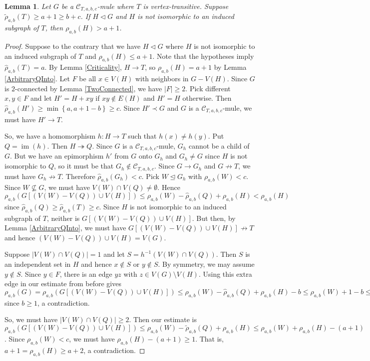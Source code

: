 \documentclass[12pt]{amsart}
\theoremstyle{plain}
\newtheorem{lem}[thm]{Lemma}
\theoremstyle{definition}
\theoremstyle{remark}
\newcommand{\fancy}[1]{\mathcal{#1}}
\newcommand{\C}{\fancy{C}}
\newcommand{\surj}{\twoheadrightarrow}
\newcommand{\set}[1]{\left\{ #1 \right\}}
\newcommand{\card}[1]{\left|#1\right|}
\newcommand{\func}[3]{#1\colon #2 \rightarrow #3}
\newcommand{\parens}[1]{\left( #1 \right)}
\newcommand{\brackets}[1]{\left[ #1 \right]}
\newcommand{\im}{\operatorname{im}}
\begin{document}
\begin{lem}\label{PlusOne}
Let $G$ be a $\C_{T,a,b,c}$-mule where $T$ is vertex-transitive. Suppose $\tilde{\rho}_{a,b}(T) \ge a + 1 \ge b + c$. If $H \lhd G$ and $H$ is not isomorphic to an induced subgraph of $T$, then $\rho_{a,b}(H) > a + 1$.
\end{lem}
\begin{proof}
Suppose to the contrary that we have $H \lhd G$ where $H$ is not isomorphic to an induced subgraph of $T$ and $\rho_{a,b}(H) \le a + 1$.  Note that the hypotheses imply $\hat{\rho}_{a,b}(T) = a$.  By Lemma \ref{Criticality}, $H \rightarrow T$, so $\rho_{a,b}(H) = a + 1$ by Lemma \ref{ArbitraryQInto}.  Let $F$ be all $x \in V(H)$ with neighbors in $G - V(H)$.  Since $G$ is $2$-connected by Lemma \ref{TwoConnected}, we have $|F| \ge 2$.  Pick different $x,y \in F$ and let $H' = H + xy$ if $xy \not \in E(H)$ and $H' = H$ otherwise.  Then $\hat{\rho}_{a,b}(H') \ge \min\set{a, a + 1 - b} \ge c$.  Since $H' \prec G$ and $G$ is a $\C_{T,a,b,c}$-mule, we must have $H' \rightarrow T$.

So, we have a homomorphism $\func{h}{H}{T}$ such that $h(x) \ne h(y)$.  Put $Q = \im(h)$. Then $H \surj Q$. Since $G$ is a $\C_{T,a,b,c}$-mule, $G_h$ cannot be a child of $G$.  But we have an epimorphism $h'$ from $G$ onto $G_h$ and $G_h \ne G$ since $H$ is not isomorphic to $Q$, so it must be that $G_h \not \in \C_{T,a,b,c}$.  Since $G \rightarrow G_h$ and $G \not \rightarrow T$, we must have $G_h \not \rightarrow T$.  Therefore $\hat{\rho}_{a,b}(G_h) < c$.  Pick $W \unlhd G_h$ with $\rho_{a,b}(W) < c$.  Since $W \not \subseteq G$, we must have $V(W) \cap V(Q) \ne \emptyset$.  Hence $\rho_{a,b}\parens{G\brackets{(V(W) - V(Q)) \cup V(H)}} \le \rho_{a,b}(W) - \hat{\rho}_{a,b}(Q) + \rho_{a,b}(H) < \rho_{a,b}(H)$ since $\hat{\rho}_{a,b}(Q) \ge \hat{\rho}_{a,b}(T) \ge c$.  Since $H$ is not isomorphic to an induced subgraph of $T$, neither is $G\brackets{(V(W) - V(Q)) \cup V(H)}$.  But then, by Lemma \ref{ArbitraryQInto}, we must have $G\brackets{(V(W) - V(Q)) \cup V(H)} \not \rightarrow T$ and hence $(V(W) - V(Q)) \cup V(H) = V(G)$.

Suppose $\card{V(W) \cap V(Q)} = 1$ and let $S = h^{-1}(V(W) \cap V(Q))$. Then $S$ is an independent set in $H$ and hence $x \not \in S$ or $y \not \in S$.  By symmetry, we may assume $y \not \in S$.  Since $y \in F$, there is an edge $yz$ with $z \in V(G)\setminus V(H)$.  Using this extra edge in our estimate from before gives $\rho_{a,b}(G) = \rho_{a,b}\parens{G\brackets{(V(W) - V(Q)) \cup V(H)}} \le \rho_{a,b}(W) - \hat{\rho}_{a,b}(Q) + \rho_{a,b}(H) - b \le \rho_{a,b}(W) + 1 - b \le \rho_{a,b}(W) < c$ since $b \ge 1$, a contradiction.

So, we must have $\card{V(W) \cap V(Q)} \ge 2$.  Then our estimate is $\rho_{a,b}\parens{G\brackets{(V(W) - V(Q)) \cup V(H)}} \le \rho_{a,b}(W) - \tilde{\rho}_{a,b}(Q) + \rho_{a,b}(H) \le
\rho_{a,b}(W) + \rho_{a,b}(H) - (a+1)$.  Since $\rho_{a,b}(W) < c$, we must have $\rho_{a,b}(H) - (a+1) \ge 1$.  That is, $a + 1 = \rho_{a,b}(H) \ge a + 2$, a contradiction.
\end{proof}
\end{document}
